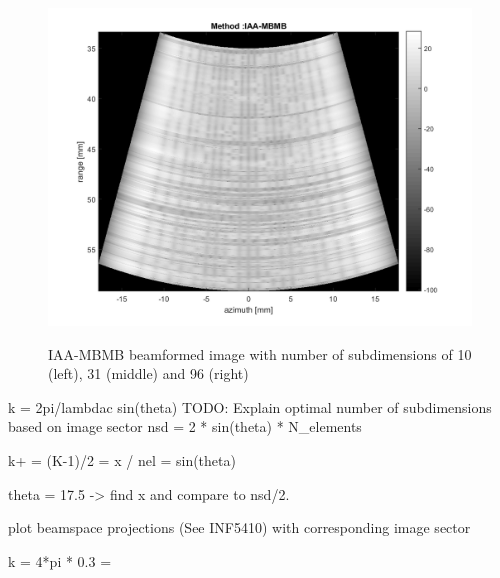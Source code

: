 \begin{figure}[ht]
\begin{minipage}[b]{0.3\linewidth}
        \includegraphics[width=\linewidth]{./images/background/IAA-MBMB_high_nsd.png}
        \label{fig:nsd_96}
    \end{minipage}
    \caption{IAA-MBMB beamformed image with number of subdimensions of 10 (left), 31 (middle) and 96 (right)}
	\label{fig:IAA_nsd}
\end{figure}


k = 2pi/lambdac sin(theta)
TODO: Explain optimal number of subdimensions based on image sector
nsd = 2 * sin(theta) * N_elements

k+ = (K-1)/2 = x / nel = sin(theta)

theta = 17.5
-> find x and compare to nsd/2.

plot beamspace projections (See INF5410) with corresponding image sector

k = 4*pi * 0.3 = 
\fi

